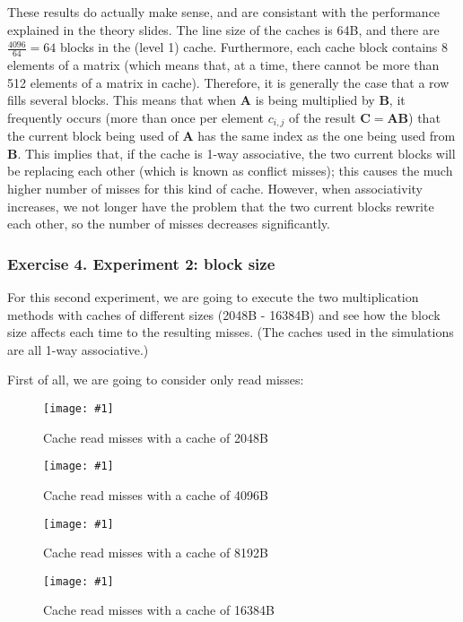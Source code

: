 \documentclass{article}
\newcommand{\myFigure}[4]{%
    \begin{figure}[!ht]
        \texttt{[image: \#1]}
        \centering
        \caption{#2}
        \label{#3}
    \end{figure}
}
\begin{document}
These results do actually make sense, and are consistant with the performance explained in the theory slides. The line size of the caches is 64B, and there are $\frac{4096}{64}=64$ blocks in the (level 1) cache. 
Furthermore, each cache block contains 8 elements of a matrix (which means that, at a time, there cannot be more than 512 elements of a matrix in cache). Therefore, it is generally the case that a row fills several blocks.
This means that when $\mathbf{A}$ is being multiplied by $\mathbf{B}$, it frequently occurs (more than once per element $c_{i,j}$ of the result $\mathbf{C}=\mathbf{AB}$) that the current block being used of $\mathbf{A}$ has the same index as the one being used from $\mathbf{B}$. This implies that, if the cache is 1-way associative, the two current blocks will be replacing each other (which is known as conflict misses); this causes the much higher number of misses for this kind of cache. However, when associativity increases, we not longer have the problem that the two current blocks rewrite each other, so the number of misses decreases significantly.


\subsubsection*{Exercise 4. Experiment 2: block size}


For this second experiment, we are going to execute the two multiplication methods with caches of different sizes (2048B - 16384B) and see how the block size affects each time to the resulting misses. (The caches used in the simulations are all 1-way associative.)

First of all, we are going to consider only read misses:


\myFigure{../material_P3/protect_out4/BlockSize_2048/cache_lectura.png}{Cache read misses with a cache of 2048B}{block_2048_lec}{0.52}

\pagebreak

\myFigure{../material_P3/protect_out4/BlockSize_4096/cache_lectura.png}{Cache read misses with a cache of 4096B}{block_4096_lec}{0.52}


\myFigure{../material_P3/protect_out4/BlockSize_8192/cache_lectura.png}{Cache read misses with a cache of 8192B}{block_8192B_lec}{0.52}

\pagebreak

\myFigure{../material_P3/protect_out4/BlockSize_16384/cache_lectura.png}{Cache read misses with a cache of 16384B}{block_16384B_lec}{0.52}
\end{document}
